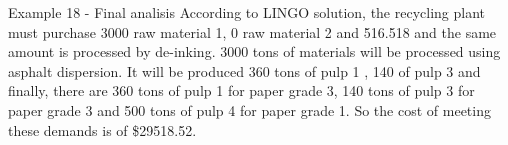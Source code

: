 \begin{frame}{Example 18 - Final analisis}
According to LINGO solution, the recycling plant must purchase 3000 raw material 1, 0 raw material 2
and 516.518 and the same amount is processed by de-inking. 3000 tons of materials will be processed
using asphalt dispersion. It will be produced 360 tons of pulp 1 , 140 of pulp 3 and finally, there are
360 tons of pulp 1 for paper grade 3, 140 tons of pulp 3 for paper grade 3 and 500 tons of pulp 4
for paper grade 1. So the cost of meeting these demands is of \$29518.52.
\end{frame}
